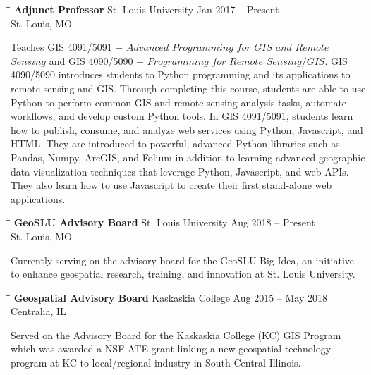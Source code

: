 \documentclass{res}
\begin{document}
\begin{resume}
   \begin{tabbing}
	\hspace{2.3in}\= \hspace{2.6in}\= \kill %
	{\bf Adjunct Professor} \>St. Louis University     \>Jan 2017 -- Present\\
	\>St. Louis, MO
\end{tabbing}\vspace{-20pt}      %
Teaches GIS 4091/5091 $-$ $Advanced$ $Programming$ $for$ $GIS$ $and$ $Remote$ $Sensing$ and GIS 4090/5090 $-$ $Programming$ $for$ $Remote$ $Sensing/GIS$. GIS 4090/5090 introduces students to Python programming and its applications to remote sensing and GIS. Through completing this course, students are able to use Python to perform common GIS and remote sensing analysis tasks, automate workflows, and develop custom Python tools. In GIS 4091/5091, students learn how to publish, consume, and analyze web services using Python, Javascript, and HTML. They are introduced to powerful, advanced Python libraries such as Pandas, Numpy, ArcGIS, and Folium in addition to learning advanced geographic data visualization techniques that leverage Python, Javascript, and web APIs. They also learn how to use Javascript to create their first stand-alone web applications. 



   \begin{tabbing}
	\hspace{2.3in}\= \hspace{2.6in}\= \kill %
	{\bf GeoSLU Advisory Board} \>St. Louis University     \>Aug 2018 -- Present\\
	\>St. Louis, MO
\end{tabbing}\vspace{-20pt}      %
Currently serving on the advisory board for the GeoSLU Big Idea, an initiative to enhance geospatial research, training, and innovation at St. Louis University.

\begin{tabbing}
	\hspace{2.3in}\= \hspace{2.6in}\= \kill %
	{\bf Geospatial Advisory Board} \>Kaskaskia College     \>Aug 2015 -- May 2018\\
	\>Centralia, IL
\end{tabbing}\vspace{-20pt}      %
Served on the Advisory Board for the Kaskaskia College (KC) GIS Program which was awarded a NSF-ATE grant linking a new geospatial technology program at KC to local/regional industry in South-Central Illinois.
   

\end{resume}
\end{document}
